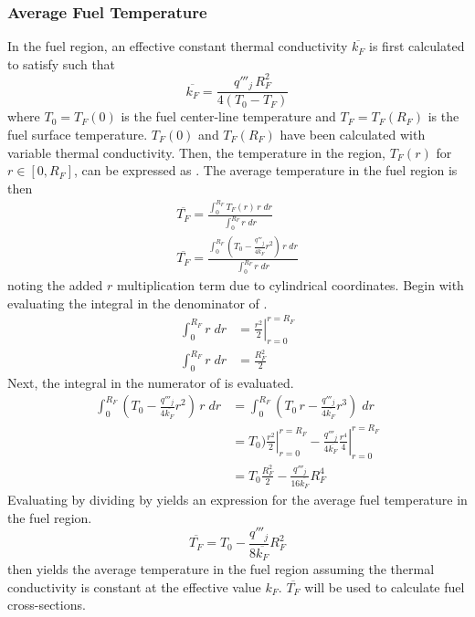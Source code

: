     \subsubsection{Average Fuel Temperature}
      In the fuel region, an effective constant thermal conductivity
      $\overline{k_F}$ is first calculated to satisfy
       such that
      \begin{equation}
        \overline{k_F} = \frac{q'''_j \, R_F^2}{4(T_0-T_F)}
      \end{equation}
      where $T_0 = T_F(0)$ is the fuel center-line temperature and
      $T_F=T_F(R_F)$ is the fuel surface temperature.
      $T_F(0)$ and $T_F(R_F)$ have been calculated with variable thermal
      conductivity. Then, the temperature in the region, $T_F(r)$ for $r \in 
      [0,R_F]$, can be expressed as . The average temperature in
      the fuel region is then
      \begin{align}
        \overline{T_F} = \frac{\int_0^{R_F} T_F(r) \, r \; dr}
          {\int_0^{R_F} r \; dr} \\
        \label{eq:tfbar_integral}
        \overline{T_F} = \frac{\int_0^{R_F} \left( T_0 - 
          \frac{q'''_j}{4 \overline{k_F}}
          r^2\right) \, r \; dr}{\int_0^{R_F} r \; dr}
      \end{align}
      noting the added $r$ multiplication term due to cylindrical coordinates.
      Begin with evaluating the integral in the denominator of
      .
      \begin{align}
        \int_0^{R_F} r \; dr &= \left. \frac{r^2}{2} \right|_{r=0}^{r=R_F} \\
        \label{eq:tf_denominator}
        \int_0^{R_F} r \; dr &= \frac{R_F^2}{2}
      \end{align}
      Next, the integral in the numerator of  is evaluated.
      \begin{align}
        \int_0^{R_F} \left( T_0 - \frac{q'''_j}{4 \overline{k_F}} r^2 \right)
          \, r \; dr&= 
          \int_0^{R_F} \left( T_0 \, r - \frac{q'''_j}{4\overline{k_F}} 
          r^3 \right) \; dr\\
        &= \left. T_0) \frac{r^2}{2} \right|_{r=0}^{r=R_F} -
          \left. \frac{q'''_j}{4 \overline{k_F}} \frac{r^4}{4} 
          \right|_{r=0}^{r=R_F} \\
        \label{eq:tf_numerator}
        &= T_0 \frac{R_F^2}{2} - \frac{q'''_j}{16 \overline{k_F}} R_F^4
      \end{align}
      Evaluating  by dividing  by
       yields an expression for the average fuel
      temperature in the fuel region.
      \begin{equation}
        \label{eq:tf_bar}
        \overline{T_F} = T_0 - \frac{q'''_j}{8 \overline{k_F}} R_F^2
      \end{equation}
       then yields the average temperature in the fuel region
      assuming the thermal conductivity is constant at the effective value
      $k_F$. $\overline{T_F}$ will be used to calculate fuel cross-sections. 

